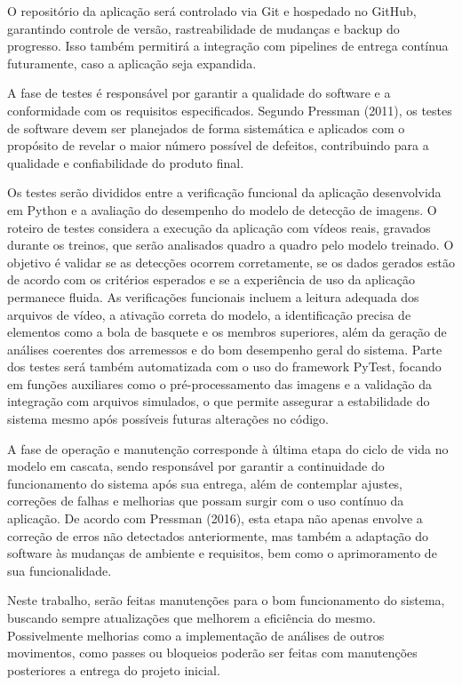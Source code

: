 O repositório da aplicação será controlado via Git e hospedado no GitHub, garantindo controle de versão, rastreabilidade de mudanças e backup do progresso. 
Isso também permitirá a integração com pipelines de entrega contínua futuramente, caso a aplicação seja expandida.

\label{sssec:testes}

A fase de testes é responsável por garantir a qualidade do software e a conformidade com os requisitos especificados. 
Segundo Pressman (2011), os testes de software devem ser planejados de forma sistemática e aplicados com o propósito de revelar o maior número possível de defeitos, contribuindo para a qualidade e confiabilidade do produto final.

Os testes serão divididos entre a verificação funcional da aplicação desenvolvida em Python e a avaliação do desempenho do modelo de detecção de imagens. 
O roteiro de testes considera a execução da aplicação com vídeos reais, gravados durante os treinos, que serão analisados quadro a quadro pelo modelo treinado. 
O objetivo é validar se as detecções ocorrem corretamente, se os dados gerados estão de acordo com os critérios esperados e se a experiência de uso da aplicação permanece fluida. 
As verificações funcionais incluem a leitura adequada dos arquivos de vídeo, a ativação correta do modelo, a identificação precisa de elementos como a bola de basquete e os membros superiores, 
além da geração de análises coerentes dos arremessos e do bom desempenho geral do sistema. Parte dos testes será também automatizada com o uso do framework PyTest, 
focando em funções auxiliares como o pré-processamento das imagens e a validação da integração com arquivos simulados, o que permite assegurar a estabilidade do sistema mesmo após possíveis futuras alterações no código.

\label{sssec:operação}

A fase de operação e manutenção corresponde à última etapa do ciclo de vida no modelo em cascata, sendo responsável por garantir a continuidade do funcionamento do sistema após sua entrega, 
além de contemplar ajustes, correções de falhas e melhorias que possam surgir com o uso contínuo da aplicação. De acordo com Pressman (2016), esta etapa não apenas envolve a correção de erros não detectados anteriormente, 
mas também a adaptação do software às mudanças de ambiente e requisitos, bem como o aprimoramento de sua funcionalidade.

Neste trabalho, serão feitas manutenções para o bom funcionamento do sistema, buscando sempre atualizações que melhorem a eficiência do mesmo. 
Possivelmente melhorias como a implementação de análises de outros movimentos, como passes ou bloqueios poderão ser feitas com manutenções posteriores a entrega do projeto inicial.

